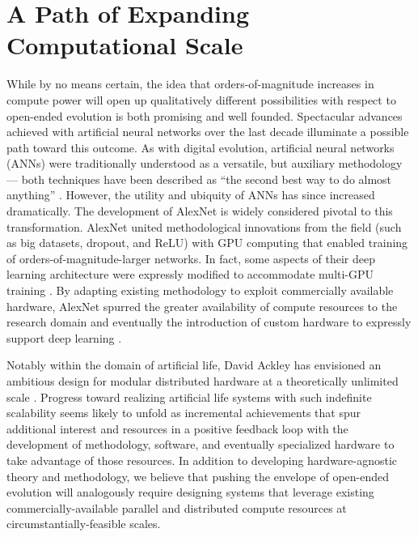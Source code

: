 \noindent{}

\section{A Path of Expanding Computational Scale}

While by no means certain, the idea that orders-of-magnitude increases in compute power will open up qualitatively different possibilities with respect to open-ended evolution is both promising and well founded.
Spectacular advances achieved with artificial neural networks over the last decade illuminate a possible path toward this outcome.
As with digital evolution, artificial neural networks (ANNs) were traditionally understood as a versatile, but auxiliary methodology --- both techniques have been described as ``the second best way to do almost anything'' \citep{miaoulis2008intelligent,eiben2015introduction}.
However, the utility and ubiquity of ANNs has since increased dramatically.
The development of AlexNet is widely considered pivotal to this transformation.
AlexNet united methodological innovations from the field (such as big datasets, dropout, and ReLU) with GPU computing that enabled training of orders-of-magnitude-larger networks.
In fact, some aspects of their deep learning architecture were expressly modified to accommodate multi-GPU training \citep{krizhevsky2012imagenet}.
By adapting existing methodology to exploit commercially available hardware, AlexNet spurred the greater availability of compute resources to the research domain and eventually the introduction of custom hardware to expressly support deep learning \citep{jouppi2017datacenter}.

Notably within the domain of artificial life, David Ackley has envisioned an ambitious design for modular distributed hardware at a theoretically unlimited scale \citep{ackley2011pursue}.
Progress toward realizing artificial life systems with such indefinite scalability seems likely to unfold as incremental achievements that spur additional interest and resources in a positive feedback loop with the development of methodology, software, and eventually specialized hardware to take advantage of those resources.
In addition to developing hardware-agnostic theory and methodology, we believe that pushing the envelope of open-ended evolution will analogously require designing systems that leverage existing commercially-available parallel and distributed compute resources at circumstantially-feasible scales.


